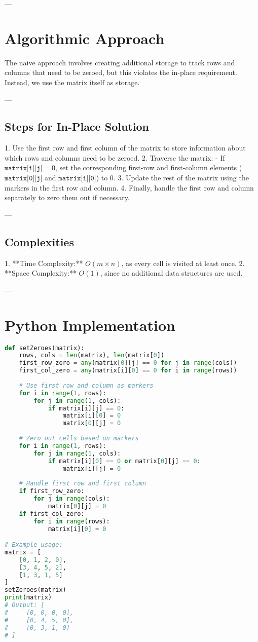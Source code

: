 ---

\section*{Algorithmic Approach}

The naive approach involves creating additional storage to track rows and columns that need to be zeroed, but this violates the in-place requirement. Instead, we use the matrix itself as storage.

---

\subsection*{Steps for In-Place Solution}
1. Use the first row and first column of the matrix to store information about which rows and columns need to be zeroed.
2. Traverse the matrix:
    - If \(\texttt{matrix[i][j]} = 0\), set the corresponding first-row and first-column elements (\(\texttt{matrix[0][j]}\) and \(\texttt{matrix[i][0]}\)) to 0.
3. Update the rest of the matrix using the markers in the first row and column.
4. Finally, handle the first row and column separately to zero them out if necessary.

---

\subsection*{Complexities}
1. **Time Complexity:** \(O(m \times n)\), as every cell is visited at least once.
2. **Space Complexity:** \(O(1)\), since no additional data structures are used.

---

\section*{Python Implementation}
\begin{fullwidth}
\begin{lstlisting}[language=Python]
def setZeroes(matrix):
    rows, cols = len(matrix), len(matrix[0])
    first_row_zero = any(matrix[0][j] == 0 for j in range(cols))
    first_col_zero = any(matrix[i][0] == 0 for i in range(rows))
    
    # Use first row and column as markers
    for i in range(1, rows):
        for j in range(1, cols):
            if matrix[i][j] == 0:
                matrix[i][0] = 0
                matrix[0][j] = 0
    
    # Zero out cells based on markers
    for i in range(1, rows):
        for j in range(1, cols):
            if matrix[i][0] == 0 or matrix[0][j] == 0:
                matrix[i][j] = 0
    
    # Handle first row and first column
    if first_row_zero:
        for j in range(cols):
            matrix[0][j] = 0
    if first_col_zero:
        for i in range(rows):
            matrix[i][0] = 0

# Example usage:
matrix = [
    [0, 1, 2, 0],
    [3, 4, 5, 2],
    [1, 3, 1, 5]
]
setZeroes(matrix)
print(matrix)
# Output: [
#     [0, 0, 0, 0],
#     [0, 4, 5, 0],
#     [0, 3, 1, 0]
# ]
\end{lstlisting}
\end{fullwidth}

